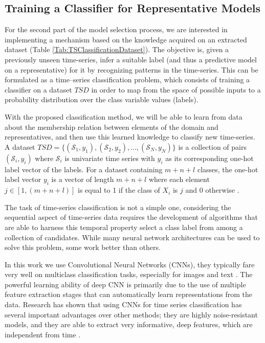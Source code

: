 \subsection{Training a Classifier for Representative Models}
\label{Sec:TrainingClassifier}
For the second part of the model selection process, we are interested in implementing a mechanism based on the knowledge acquired on an extracted dataset (Table \ref{Tab:TSClassificationDataset}). The objective is, given a previously unseen time-series, infer a suitable label (and thus a predictive model on a representative) for it by recognizing patterns in the time-series. This can be formulated as a time--series classification problem, which consists of training a classifier on a dataset $TSD$ in order to map from the space of possible inputs to a probability distribution over the class variable values (labels). 

With the proposed classification method, we will be able to learn from data about the membership relation between elements of the domain and representatives, and then use this learned knowledge to classify new time-series. A dataset $TSD=\{(\mathcal{S}_1,y_1),(\mathcal{S}_2,y_2), \ldots ,(\mathcal{S}_N,y_N)\}$ is a collection of pairs $(\mathcal{S}_i,y_i)$ where $\mathcal{S}_i$ is univariate time series with $y_i$ as its corresponding one-hot label vector of the labels. For a dataset containing $m+n+l$ classes, the one-hot label vector $y_i$ is a vector of length $m+n+l$ where each element $j \in [1,(m+n+l)]$ is equal to 1 if the class of $X_i$ is $j$ and $0$ otherwise \cite{Mitsa2010}.

The task of time-series classification is not a simple one, considering the sequential aspect of time-series data requires the development of algorithms that are able to harness this temporal property select a class label from among a collection of candidates. While many neural network architectures can be used to solve this problem, some work better than others. 

In this work we use Convolutional Neural Networks (CNNs), they typically fare very well on multiclass classification tasks, especially for images and text \cite{Fawaz2019}. The powerful learning ability of deep CNN is primarily due to the use of multiple feature extraction stages that can automatically learn representations from the data. Research has shown that using CNNs for time series classification has several important advantages over other methods; they are highly noise-resistant models, and they are able to extract very informative, deep features, which are independent from time \cite{Sainath2015}.

